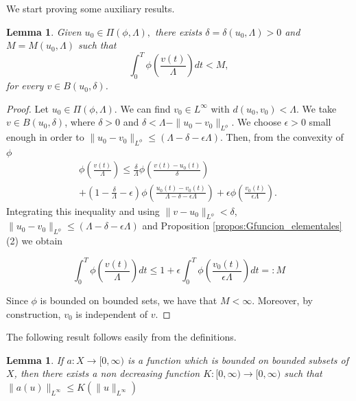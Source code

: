 \documentclass[twoside]{article}
\theoremstyle{definition}
\theoremstyle{plain}
\newtheorem{lem}[definition]{Lemma}
\theoremstyle{remark}
\begin{document}
We start proving some auxiliary results. 

\begin{lem}\label{lema:cotauniforme}
Given $u_0 \in \Pi(\phi, \Lambda),$ there exists $ \delta=\delta(u_0,\Lambda)>0$ and $ M=M(u_0,\Lambda)$ such that
\[\int_0^T{\phi \left(\frac{v(t)}{\Lambda}\right) dt}< M,\] 
for every  $ v \in B(u_0, \delta)$.
\end{lem}

\begin{proof} 
Let  $u_0 \in \Pi(\phi, \Lambda )$. We can find $v_0 \in L^\infty$ with $d(u_0, v_0) < \Lambda$. We take $ v \in B(u_0, \delta)$, where $\delta > 0$ and $\delta< \Lambda-\|u_0-v_0\|_{L^\phi}$.
We choose  $ \epsilon>0$ small enough in order to $\|u_0-v_0\|_{L^\phi} \leq \left(\Lambda-\delta-\epsilon\Lambda\right)$. Then, from the convexity of $\phi$
\begin{multline*}
  \phi \left(\frac{v(t)}{\Lambda} \right)  %
%
%
  \leq \frac{\delta}{\Lambda}\phi \left(\frac{v(t)-u_0(t)}{\delta} \right)\\
  +\left(1-\frac{\delta}{\Lambda}-\epsilon\right) \phi \left(\frac{u_0(t)-v_0(t)}{\Lambda-\delta-\epsilon\Lambda}\right) + \epsilon \phi \left( \frac{v_0(t)}{\epsilon\Lambda }\right).\
\end{multline*}
Integrating this inequality and using $\|v-u_0\|_{L^\phi}<\delta$, $\|u_0-v_0\|_{L^\phi} \leq \left(\Lambda-\delta-\epsilon\Lambda\right)$ and   Proposition \ref{propos:Gfuncion_elementales}(2)   we obtain

\[\int_0^T\phi \left(\frac{v(t)}{\Lambda} \right) dt\leq 1+\epsilon \int_0^T\phi \left( \frac{v_0(t)}{\epsilon\Lambda }\right)dt=:M\]

Since $\phi$ is bounded on bounded sets,  we have that $M<\infty$.   Moreover, by construction, $v_0$ is independent of $v$.
\end{proof}
The following result follows easily from the definitions.
\begin{lem}\label{lema:cotanemi}
 If $a:X\to[0,\infty)$ is a function which is bounded on bounded subsets of $X$,  then  there exists a non decreasing function  $K:[0,\infty)\to[0,\infty)$ such that $\|a(u)\|_{L^\infty}\leq K(\|u\|_{L^\infty})$
\end{lem}
\end{document}
